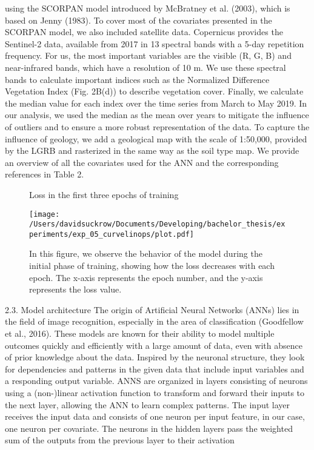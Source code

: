 using the SCORPAN model introduced by McBratney et al. (2003),
which is based on Jenny (1983). To cover most of the covariates presented
in the SCORPAN model, we also included satellite data. Copernicus
provides the Sentinel-2 data, available from 2017 in 13 spectral
bands with a 5-day repetition frequency. For us, the most important
variables are the visible (R, G, B) and near-infrared bands, which have a
resolution of 10 m. We use these spectral bands to calculate important
indices such as the Normalized Difference Vegetation Index (Fig. 2B(d))
to describe vegetation cover. Finally, we calculate the median value for
each index over the time series from March to May 2019. In our analysis,
we used the median as the mean over years to mitigate the influence of
outliers and to ensure a more robust representation of the data. To
capture the influence of geology, we add a geological map with the scale
of 1:50,000, provided by the LGRB and rasterized in the same way as the
soil type map. We provide an overview of all the covariates used for the
ANN and the corresponding references in Table 2.

\begin{figure}[h]
    \centering
    \caption{Loss in the first three epochs of training}  %
    \texttt{[image: /Users/davidsuckrow/Documents/Developing/bachelor\_thesis/experiments/exp\_05\_curvelinops/plot.pdf]}  %
    \captionsetup{justification=justified}  %
    \hfill \caption*{In this figure, we observe the behavior of the model during the initial phase of training, showing how the loss decreases with each epoch. The x-axis represents the epoch number, and the y-axis represents the loss value.}  %
    \captionsetup{justification=centering}
    \label{fig:example}
\end{figure}


2.3. Model architecture
The origin of Artificial Neural Networks (ANNs) lies in the field of
image recognition, especially in the area of classification (Goodfellow
et al., 2016). These models are known for their ability to model multiple
outcomes quickly and efficiently with a large amount of data, even with
absence of prior knowledge about the data. Inspired by the neuronal
structure, they look for dependencies and patterns in the given data that
include input variables and a responding output variable. ANNS are
organized in layers consisting of neurons using a (non-)linear activation
function to transform and forward their inputs to the next layer,
allowing the ANN to learn complex patterns. The input layer receives the
input data and consists of one neuron per input feature, in our case, one
neuron per covariate. The neurons in the hidden layers pass the
weighted sum of the outputs from the previous layer to their activation

